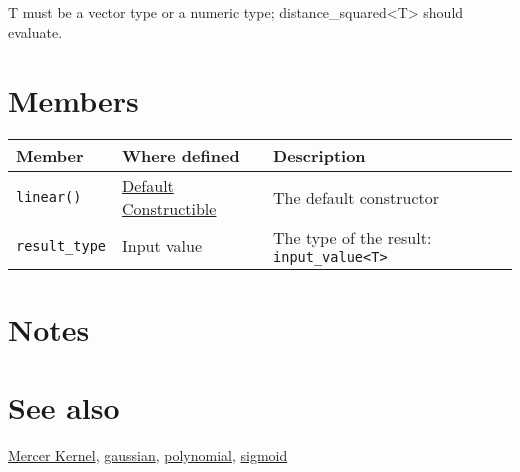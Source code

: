 \documentclass{article}
\begin{document}
T must be a vector type or a numeric type; distance_squared<T> should evaluate.


\section*{Members}

\begin{tabular}{lll}
\textbf{Member} & \textbf{Where defined} & \textbf{Description} \\
\hline
\texttt{linear()} & \href{http://www.sgi.com/tech/stl/DefaultConstructible.html}{Default Constructible} & The default constructor \\
\texttt{result_type} & Input value & The type of the result: \texttt{input_value<T>} \\
\end{tabular}

\section*{Notes}

\section*{See also}

\href{\kmlroot/mercer_kernel.html}{Mercer Kernel},
\href{\kmlroot/gaussian.html}{gaussian},
\href{\kmlroot/polynomial.html}{polynomial},
\href{\kmlroot/sigmoid.html}{sigmoid}



\end{document}
